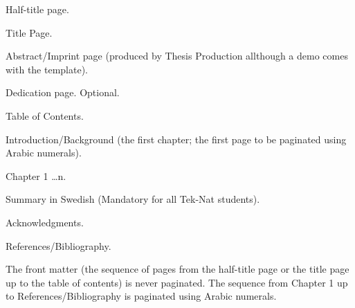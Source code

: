 \begin{bulletlist}
    \item Half-title page.
    \item Title Page.
    \item Abstract/Imprint page (produced by Thesis Production all\-though a demo comes with the template).
    \item Dedication page. Optional.
    \item Table of Contents.
    \item Introduction/Background (the first chapter; the first page to be paginated using Arabic numerals).
    \item Chapter 1 \ldots n.
    \item Summary in Swedish (Mandatory for all Tek-Nat students).
    \item Acknowledgments.
    \item References/Bibliography.
\end{bulletlist}
\vspace{1\baselineskip}
\noindent The front matter (the sequence of pages from the half-title page or the title page up to the table of contents) is never paginated. The sequence from Chapter 1 up to References/Bibliography is paginated using Arabic numerals. 
